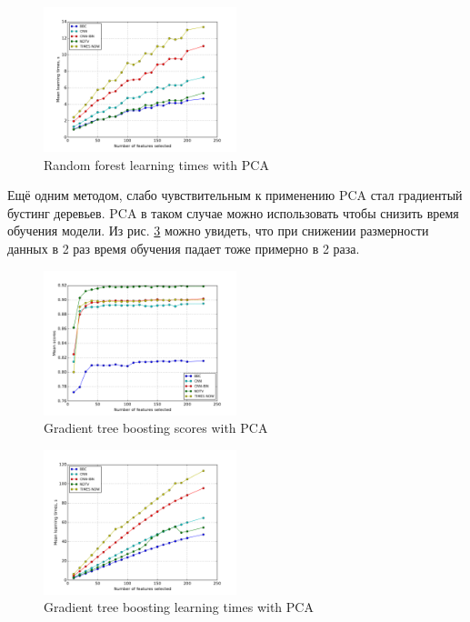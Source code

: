  \begin{figure}[h!]
    \centering
    \includegraphics[width=0.5\textwidth]{images/PCA-randforTime.png}
    \caption{Random forest learning times with PCA}
    \label{fig:randfor_pca_times}
\end{figure} 
  \par
  Ещё одним методом, слабо чувствительным к применению PCA стал градиентый бустинг деревьев. PCA в таком случае можно использовать чтобы снизить время обучения модели. Из рис. \ref{fig:gtb_pca_times} можно увидеть, что при снижении размерности данных в 2 раз время обучения падает тоже примерно в 2 раза.

\begin{figure}[h!]
    \centering
    \includegraphics[width=0.5\textwidth]{images/PCA-GTB.png}
    \caption{Gradient tree boosting scores with PCA}
    \label{fig:gtb_pca_scores}
\end{figure} 
 
 \begin{figure}[h!]
    \centering
    \includegraphics[width=0.5\textwidth]{images/PCA-GTBTime.png}
    \caption{Gradient tree boosting learning times with PCA}
    \label{fig:gtb_pca_times}
\end{figure}
\par